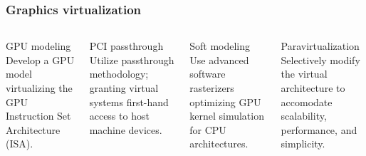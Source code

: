 \begin{frame}
\frametitle{Graphics virtualization}

\begin{columns}
	\begin{block}{GPU modeling}
		Develop a GPU model virtualizing the GPU Instruction Set Architecture (ISA).
	\end{block}
	\begin{block}{PCI passthrough}
		Utilize passthrough methodology; granting virtual systems first-hand access to host machine devices.
	\end{block}
    \begin{block}{Soft modeling}
    	Use advanced software rasterizers optimizing GPU kernel simulation for CPU architectures.
    \end{block}
    \begin{block}{Paravirtualization}
    	Selectively modify the virtual architecture to accomodate scalability, performance, and simplicity.
    \end{block}
\end{columns}
	
\end{frame}
